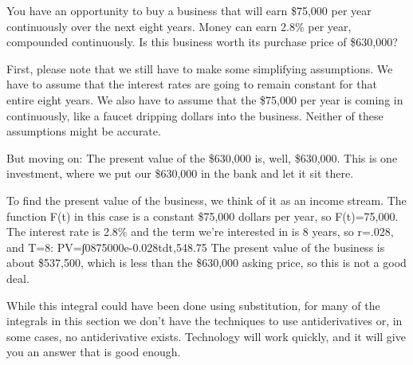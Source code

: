 \begin{example}
You have an opportunity to buy a business that will earn \$75,000 per year continuously over the next eight years. Money can earn 2.8\% per year, compounded continuously. Is this business worth its purchase price of \$630,000?

\begin{solution}
  First, please note that we still have to make some simplifying assumptions. We have to assume that the interest rates are going to remain constant for that entire eight years. We also have to assume that the \$75,000 per year is coming in continuously, like a faucet dripping dollars into the business. Neither of these assumptions might be accurate.

But moving on: The present value of the \$630,000 is, well, \$630,000. This is one investment, where we put our \$630,000 in the bank and let it sit there.

To find the present value of the business, we think of it as an income stream. The function F(t) in this case is a constant \$75,000 dollars per year, so F(t)=75,000. The interest rate is 2.8\% and the term we're interested in is 8 years, so r=.028, and T=8:
PV=∫0875000e-0.028tdt,548.75
The present value of the business is about \$537,500, which is less than the \$630,000 asking price, so this is not a good deal.
\end{solution}\end{example}

While this integral could have been done using substitution, for many of the integrals in this section we don't have the techniques to use antiderivatives or, in some cases, no antiderivative exists. Technology will work quickly, and it will give you an answer that is good enough.

